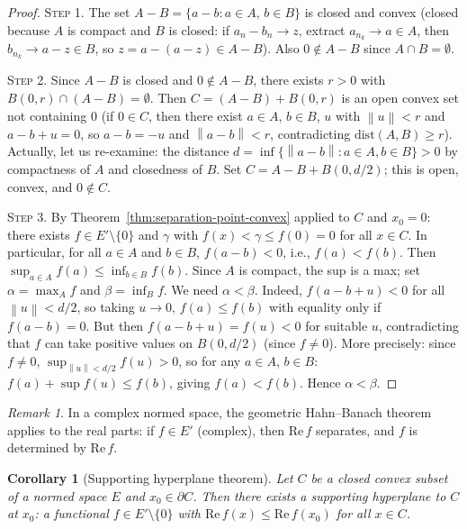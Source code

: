 \documentclass[a4paper,12pt]{book}
\newcommand{\norm}[1]{\left\| #1 \right\|}
\theoremstyle{definition}
\theoremstyle{plain}
\newtheorem{corollary}[definition]{Corollary}
\theoremstyle{remark}
\newtheorem{remark}[definition]{Remark}
\begin{document}
\begin{proof}
\textsc{Step 1.} The set $A-B = \{a-b:a\in A,\,b\in B\}$ is closed and convex
(closed because $A$ is compact and $B$ is closed: if $a_n-b_n\to z$, extract
$a_{n_k}\to a\in A$, then $b_{n_k}\to a-z\in B$, so $z=a-(a-z)\in A-B$).
Also $0\notin A-B$ since $A\cap B=\emptyset$.

\textsc{Step 2.} Since $A-B$ is closed and $0\notin A-B$, there exists $r>0$
with $B(0,r)\cap(A-B)=\emptyset$. Then $C = (A-B)+B(0,r)$ is an open convex set
not containing $0$ (if $0\in C$, then there exist $a\in A$, $b\in B$, $u$ with
$\norm{u}<r$ and $a-b+u=0$, so $a-b=-u$ and $\norm{a-b}<r$, contradicting
$\mathrm{dist}(A,B)\geq r$). Actually, let us re-examine: the distance
$d=\inf\{\norm{a-b}:a\in A,b\in B\}>0$ by compactness of $A$ and closedness
of $B$. Set $C=A-B+B(0,d/2)$; this is open, convex, and $0\notin C$.

\textsc{Step 3.} By Theorem~\ref{thm:separation-point-convex} applied to $C$
and $x_0=0$: there exists $f\in E'\setminus\{0\}$ and $\gamma$ with
$f(x)<\gamma\leq f(0)=0$ for all $x\in C$. In particular, for all $a\in A$
and $b\in B$, $f(a-b)<0$, i.e., $f(a)<f(b)$. Then
$\sup_{a\in A}f(a)\leq\inf_{b\in B}f(b)$. Since $A$ is compact, the sup is a
max; set $\alpha=\max_A f$ and $\beta=\inf_B f$. We need $\alpha<\beta$. Indeed,
$f(a-b+u)<0$ for all $\norm{u}<d/2$, so taking $u\to 0$,
$f(a)\leq f(b)$ with equality only if $f(a-b)=0$. But then
$f(a-b+u)=f(u)<0$ for suitable $u$, contradicting that $f$ can take positive
values on $B(0,d/2)$ (since $f\neq 0$). More precisely: since $f\neq 0$,
$\sup_{\norm{u}<d/2}f(u)>0$, so for any $a\in A$, $b\in B$:
$f(a)+\sup f(u)\leq f(b)$, giving $f(a)<f(b)$. Hence $\alpha<\beta$.
\end{proof}

\begin{remark}\label{rem:separation-complex}
In a complex normed space, the geometric Hahn--Banach theorem applies to the
real parts: if $f\in E'$ (complex), then $\mathrm{Re}\,f$ separates, and $f$
is determined by $\mathrm{Re}\,f$.
\end{remark}

\begin{corollary}[Supporting hyperplane theorem]\label{cor:supporting-hyperplane}
Let $C$ be a closed convex subset of a normed space $E$ and $x_0\in\partial C$.
Then there exists a supporting hyperplane to $C$ at $x_0$: a functional
$f\in E'\setminus\{0\}$ with $\mathrm{Re}\,f(x)\leq\mathrm{Re}\,f(x_0)$
for all $x\in C$.
\end{corollary}
\end{document}
